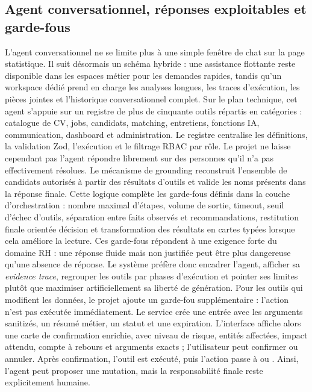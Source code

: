 \subsection{Agent conversationnel, réponses exploitables et garde-fous}
L'agent conversationnel ne se limite plus à une simple fenêtre de chat sur la page statistique. Il suit désormais un schéma hybride : une assistance flottante reste disponible dans les espaces métier pour les demandes rapides, tandis qu'un workspace dédié  prend en charge les analyses longues, les traces d'exécution, les pièces jointes et l'historique conversationnel complet.
Sur le plan technique, cet agent s'appuie sur un registre de plus de cinquante outils répartis en catégories : catalogue de CV, jobs, candidats, matching, entretiens, fonctions IA, communication, dashboard et administration. Le registre centralise les définitions, la validation Zod, l'exécution et le filtrage RBAC par rôle.
Le projet ne laisse cependant pas l'agent répondre librement sur des personnes qu'il n'a pas effectivement résolues. Le mécanisme de grounding reconstruit l'ensemble de candidats autorisés à partir des résultats d'outils et valide les noms présents dans la réponse finale. Cette logique complète les garde-fous définis dans la couche d'orchestration : nombre maximal d'étapes, volume de sortie, timeout, seuil d'échec d'outils, séparation entre faits observés et recommandations, restitution finale orientée décision et transformation des résultats en cartes typées lorsque cela améliore la lecture.
Ces garde-fous répondent à une exigence forte du domaine RH : une réponse fluide mais non justifiée peut être plus dangereuse qu'une absence de réponse. Le système préfère donc encadrer l'agent, afficher sa \textit{evidence trace}, regrouper les outils par phases d'exécution et pointer ses limites plutôt que maximiser artificiellement sa liberté de génération.
Pour les outils qui modifient les données, le projet ajoute un garde-fou supplémentaire : l'action n'est pas exécutée immédiatement. Le service  crée une entrée  avec les arguments sanitizés, un résumé métier, un statut  et une expiration. L'interface affiche alors une carte de confirmation enrichie, avec niveau de risque, entités affectées, impact attendu, compte à rebours et arguments exacts ; l'utilisateur peut confirmer ou annuler. Après confirmation, l'outil est exécuté, puis l'action passe à  ou . Ainsi, l'agent peut proposer une mutation, mais la responsabilité finale reste explicitement humaine.

